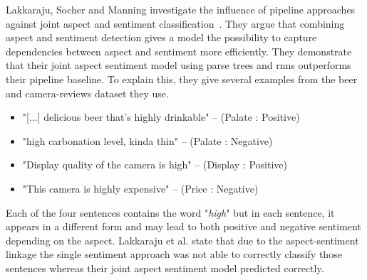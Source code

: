Lakkaraju, Socher and Manning investigate the influence of pipeline approaches against joint aspect and sentiment classification~\cite{Lakkaraju2014}. They argue that combining aspect and sentiment detection gives a model the possibility to capture dependencies between aspect and sentiment more efficiently. They demonstrate that their joint aspect sentiment model using parse trees and \glspl{rnn} outperforms their pipeline baseline. To explain this, they give several examples from the beer~\cite{McAuley2012, McAuley2013b} and camera-reviews dataset they use. 

\begin{itemize}
    \item "{[...]} delicious beer that’s highly drinkable" -- {(Palate : Positive)}
    \item "high carbonation level, kinda thin" -- {(Palate : Negative)}
    \item "Display quality of the camera is high" -- {(Display : Positive)}
    \item "This camera is highly expensive" -- {(Price : Negative)}
\end{itemize}

Each of the four sentences contains the word "\textit{high}" but in each sentence, it appears in a different form and may lead to both positive and negative sentiment depending on the aspect. Lakkaraju et al. state that due to the aspect-sentiment linkage the single sentiment approach was not able to correctly classify those sentences whereas their joint aspect sentiment model predicted correctly.
\medskip

